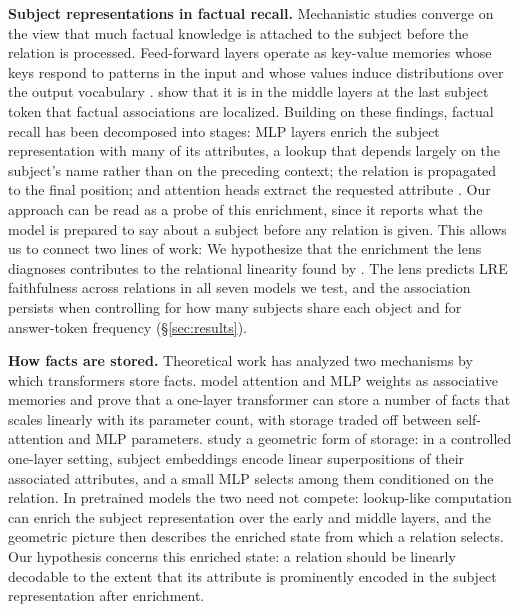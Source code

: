 \textbf{Subject representations in factual recall.} Mechanistic studies
converge on the view that much factual knowledge is attached to the
subject before the relation is processed.
Feed-forward layers operate as key-value memories whose keys respond
to patterns in the input and whose values induce distributions over the
output vocabulary \citep{geva2021transformer}.
\citet{meng2022locating} show that it is in the middle
layers at the last subject token that
factual
associations are localized.
Building on these findings, factual recall has been decomposed into
stages: MLP layers enrich the subject representation with many of its
attributes, a lookup that depends largely on the subject's name rather
than on the preceding context; the relation is propagated to the final
position; and attention heads extract the requested attribute
\citep{geva-etal-2023-dissecting, nanda2024fact}. Our approach can be read as a probe of this
enrichment, since it reports what the model is prepared to say about a
subject before any relation is given. This allows us to connect two
lines of work: We hypothesize that the enrichment the lens diagnoses
contributes to the relational linearity found by
\citet{hernandez2024linearity}. The lens predicts LRE
faithfulness across relations in all seven models we test, and the association persists when controlling for how many subjects
share each object and for answer-token frequency (§\ref{sec:results}).


\textbf{How facts are stored.} Theoretical work has analyzed two mechanisms by which transformers store facts.
\citet{nichani2025understanding} model attention and MLP
weights as associative memories and prove that a one-layer transformer
can store a number of facts that scales linearly with its parameter
count, with storage traded off between self-attention and MLP
parameters. \citet{DBLP:journals/corr/abs-2605-12426} study a
geometric form of storage: in a controlled one-layer setting, subject
embeddings encode linear superpositions of their associated attributes,
and a small MLP selects among them conditioned on the relation. In
pretrained models the two need not compete: lookup-like computation can
enrich the subject representation over the early and middle layers, and
the geometric picture then describes the enriched state from which a
relation selects. Our hypothesis concerns this enriched state: a
relation should be linearly decodable to the extent that its attribute
is prominently encoded in the subject representation after enrichment.

